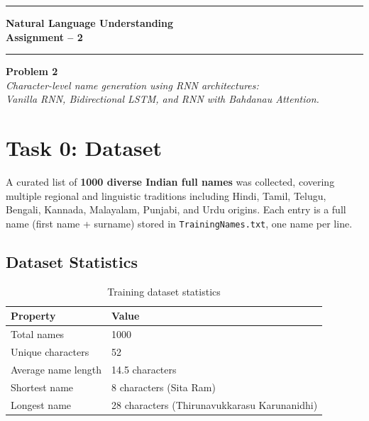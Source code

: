 \documentclass[11pt,a4paper]{article}
\begin{document}
\begin{titlepage}
  \centering
  \vspace*{2cm}
  {\color{iitjblue}\rule{\linewidth}{2pt}}\vspace{0.4cm}

  {\Huge\bfseries\color{iitjblue} Natural Language Understanding\\[0.3em]
   \Large Assignment -- 2}\\[0.6em]

  {\color{iitjblue}\rule{\linewidth}{2pt}}

  \vspace{1.5cm}
  {\Large\bfseries Problem 2}\\[2em]

  \vfill
  \textit{\color{darkgray}
    Character-level name generation using RNN architectures:\\
    Vanilla RNN, Bidirectional LSTM, and RNN with Bahdanau Attention.}
  \vspace{1cm}
\end{titlepage}

\tableofcontents
\newpage

\section{Task 0: Dataset}

A curated list of \textbf{1000 diverse Indian full names} was collected, covering multiple regional and linguistic traditions including Hindi, Tamil, Telugu, Bengali, Kannada, Malayalam, Punjabi, and Urdu origins. Each entry is a full name (first name + surname) stored in \texttt{TrainingNames.txt}, one name per line.

\subsection{Dataset Statistics}
\begin{table}[H]
\centering
\caption{Training dataset statistics}
\renewcommand{\arraystretch}{1.3}
\begin{tabularx}{\textwidth}{lX}
\toprule
\textbf{Property} & \textbf{Value} \\
\midrule
Total names & 1000 \\
Unique characters & 52 \\
Average name length & 14.5 characters \\
Shortest name & 8 characters (Sita Ram) \\
Longest name & 28 characters (Thirunavukkarasu Karunanidhi) \\
\bottomrule
\end{tabularx}
\end{table}
\end{document}
